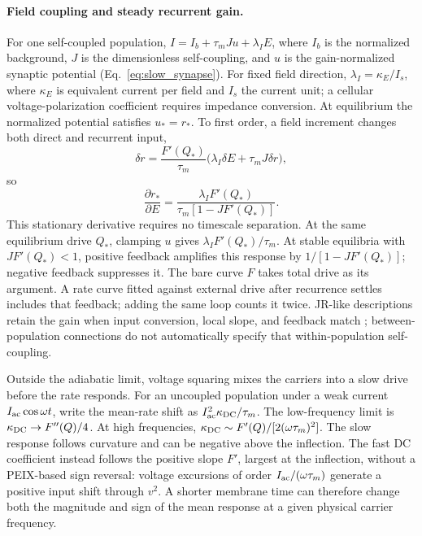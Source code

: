 \documentclass[a4paper]{article}
\begin{document}
\paragraph{Field coupling and steady recurrent gain.}
For one self-coupled population, $I=I_b+\tau_mJu+\lambda_I E$, where $I_b$ is
the normalized background, $J$ is the dimensionless self-coupling, and $u$
is the gain-normalized synaptic potential (Eq.~\eqref{eq:slow_synapse}).
For fixed field direction, $\lambda_I=\kappa_E/I_s$, where $\kappa_E$ is equivalent
current per field and $I_s$ the current unit; a cellular voltage-polarization
coefficient requires impedance conversion.
At equilibrium the normalized potential satisfies $u_*=r_*$. To first order, a field increment changes both direct and recurrent input,
\begin{equation}
\delta r=\frac{F'(Q_*)}{\tau_m}\big(\lambda_I\delta E+\tau_mJ\delta r\big),
\end{equation}
so
\begin{equation}
\frac{\partial r_*}{\partial E}
=\frac{\lambda_I F'(Q_*)}{\tau_m[1-JF'(Q_*)]}.
\label{eq:slow-field-gain}
\end{equation}
This stationary derivative requires no timescale separation.
At the same equilibrium drive $Q_*$, clamping $u$ gives $\lambda_I F'(Q_*)/\tau_m$.
At stable equilibria with $JF'(Q_*)<1$, positive feedback amplifies this response by
$1/[1-JF'(Q_*)]$; negative feedback suppresses it.
The bare curve $F$ takes total drive as its argument. A rate curve fitted against external drive after
recurrence settles includes that feedback; adding the same loop counts it twice.
JR-like descriptions retain the gain when input conversion, local slope, and feedback
match \cite{ruffini2021nmm2,clusella2023}; between-population connections do not
automatically specify that within-population self-coupling.

Outside the adiabatic limit, voltage squaring mixes the carriers into a slow drive before the rate responds. For an uncoupled population under a weak current
$I_{\rm ac}\cos\omega t$, write the mean-rate shift as
$I_{\rm ac}^2\kappa_{\rm DC}/\tau_m$. The low-frequency limit is $\kappa_{\rm DC}\to F''(Q)/4$. At high frequencies,
$\kappa_{\rm DC}\sim F'(Q)/[2(\omega\tau_m)^2]$.
The slow response follows curvature and can be negative above the inflection.
The fast DC coefficient instead follows the positive slope $F'$, largest at the
inflection, without a PEIX-based sign reversal: voltage excursions of order
$I_{\rm ac}/(\omega\tau_m)$ generate a positive input shift through $v^2$.
A shorter membrane time can therefore change both the magnitude and sign
of the mean response at a given physical carrier frequency.
\end{document}
